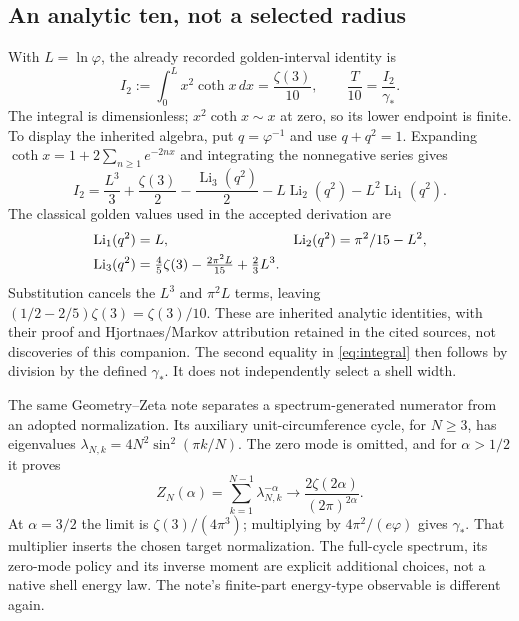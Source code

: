 \documentclass[11pt,a4paper]{article}
\newcommand{\ph}{\varphi}\newcommand{\Li}{\operatorname{Li}}\newcommand{\conv}{\operatorname{conv}}
\begin{document}
\subsection{An analytic ten, not a selected radius}
With $L=\ln\ph$, the already recorded golden-interval identity is
\begin{equation}\label{eq:integral}
I_2:=\int_0^L x^2\coth x\,dx=\frac{\zeta(3)}{10},
\qquad \frac{T}{10}=\frac{I_2}{\gamma_*}.
\end{equation}
The integral is dimensionless; $x^2\coth x\sim x$ at zero, so its lower endpoint is finite. To display the inherited algebra, put $q=\ph^{-1}$ and use $q+q^2=1$. Expanding $\coth x=1+2\sum_{n\geq1}e^{-2nx}$ and integrating the nonnegative series gives
\begin{equation}\label{eq:polylog}
I_2=\frac{L^3}{3}+\frac{\zeta(3)}2
-\frac{\Li_3(q^2)}2-L\Li_2(q^2)-L^2\Li_1(q^2).
\end{equation}
The classical golden values used in the accepted derivation are
\begin{align}
\Li_1(q^2)&=L,&\Li_2(q^2)&=\pi^2/15-L^2,\notag\\
\Li_3(q^2)&=\tfrac45\zeta(3)-\tfrac{2\pi^2L}{15}+\tfrac23L^3.\label{eq:golden-polylogs}
\end{align}
Substitution cancels the $L^3$ and $\pi^2L$ terms, leaving $(1/2-2/5)\zeta(3)=\zeta(3)/10$. These are inherited analytic identities, with their proof and Hjortnaes/Markov attribution retained in the cited sources, not discoveries of this companion. The second equality in \eqref{eq:integral} then follows by division by the defined $\gamma_*$. It does not independently select a shell width.~\cite[Sec.~7]{GZ}~\cite[App.~E, printed pp.~24--25]{SP}

The same Geometry--Zeta note separates a spectrum-generated numerator from an adopted normalization. Its auxiliary unit-circumference cycle, for $N\geq3$, has eigenvalues $\lambda_{N,k}=4N^2\sin^2(\pi k/N)$. The zero mode is omitted, and for $\alpha>1/2$ it proves
\begin{equation}\label{eq:spectrum}
Z_N(\alpha)=\sum_{k=1}^{N-1}\lambda_{N,k}^{-\alpha}
\longrightarrow\frac{2\zeta(2\alpha)}{(2\pi)^{2\alpha}}.
\end{equation}
At $\alpha=3/2$ the limit is $\zeta(3)/(4\pi^3)$; multiplying by $4\pi^2/(e\ph)$ gives $\gamma_*$. That multiplier inserts the chosen target normalization. The full-cycle spectrum, its zero-mode policy and its inverse moment are explicit additional choices, not a native shell energy law. The note's finite-part energy-type observable is different again.~\cite[Secs.~3--6]{GZ}
\end{document}
